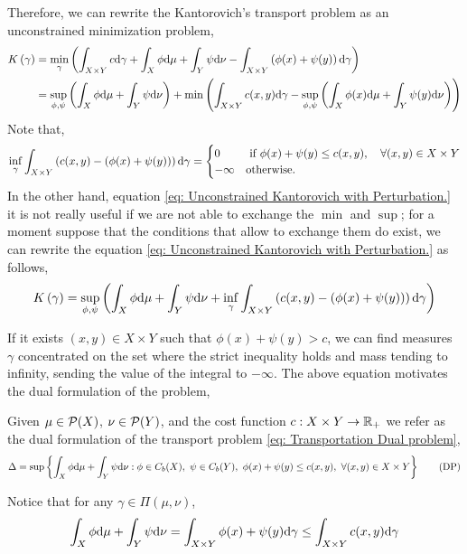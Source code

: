 Therefore, we can rewrite the Kantorovich's transport problem as an unconstrained minimization problem,    
\begin{align}
	K\left(\gamma\right)&=\min_{\gamma}\left( \int_{X\times Y} c\mathrm{d}\gamma +\int_{X} \phi \mathrm{d}\mu +\int_{Y} \psi\mathrm{d}\nu - \int_{X\times Y}\left( \phi(x)+\psi(y) \right)\mathrm{d}\gamma \right) \\
	&=\sup_{\phi,\psi}\left(  \int_{X}\phi\mathrm{d}\mu+\int_{Y}\psi\mathrm{d}\nu \right)+\min\left( \int_{X\times Y}c(x,y)\mathrm{d}\gamma-\sup_{\phi, \psi}\left( \int_{X}\phi(x)\mathrm{d}\mu+\int_{Y}\psi(y)\mathrm{d}\nu \right) \right) \label{eq: Unconstrained Kantorovich with Perturbation.}
\end{align}
Note that,
\begin{equation}
\inf_{\gamma}\int_{X\times Y}\left( c(x,y)-\left( \phi(x)+\psi(y) \right) \right) \mathrm{d} \gamma =\begin{cases}
	0 & \text{ if } \phi(x)+\psi(y)\leq c(x,y),\quad \forall (x,y)\in X\times Y \\
	-\infty & \text{otherwise}.
 \end{cases}
\end{equation}
In the other hand, equation \eqref{eq: Unconstrained Kantorovich with Perturbation.} it is not really useful if we are not able to exchange the $\min$ and $\sup$; for a moment suppose that the conditions that allow to exchange them do exist, we can rewrite the equation \eqref{eq: Unconstrained Kantorovich with Perturbation.} as follows,
\begin{equation}
	K\left(\gamma\right)=\sup_{\phi, \psi}\left( \int_{X}\phi\mathrm{d}\mu+\int_{Y}\psi\mathrm{d}\nu+\inf_{\gamma}\int_{X\times Y}\left( c(x,y)-\left( \phi(x)+\psi(y) \right) \right)\mathrm{d}\gamma \right)
\end{equation}

If it exists $(x,y) \in X\times Y$ such that $\phi(x)+\psi(y)>c$, we can find measures $\gamma$ concentrated on the set where the strict inequality holds and mass tending to infinity, sending the value of the integral to $-\infty$. The above equation motivates the dual formulation of the problem,

\begin{problem}
Given $\mu\in\mathcal{P}(X)$, $\nu\in\mathcal{P}(Y)$, and the cost function $c:X\times Y\rightarrow \mathbb{R}_+$ we refer as the dual formulation of the transport problem \eqref{eq: Transportation Dual problem},
\begin{equation}
\Delta=\sup\braces{\int_X\phi\dmu+\int_Y\psi \dnu: \phi \in C_b(X),\ \psi \in C_b(Y),\ \phi(x)+\psi(y)\leq c(x,y),\ \forall (x,y)\in X\times Y} \tag{DP} \label{eq: Transportation Dual problem}
\end{equation}	
\end{problem}
Notice that for any $\gamma\in \Pi(\mu, \nu)$,
\begin{equation}
	\int_{X}\phi\mathrm{d}\mu+\int_{Y}\psi\mathrm{d}\nu=\int_{X\times Y} \phi(x)+\psi(y)\mathrm{d} \gamma \leq \int_{X\times Y} c(x,y)\mathrm{d} \gamma
\end{equation}

